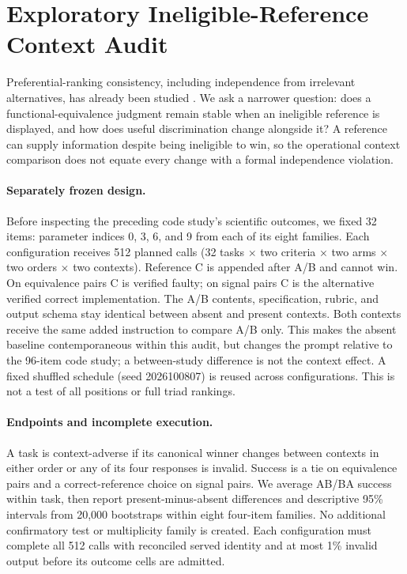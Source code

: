 \documentclass[10pt]{article}
\begin{document}
\section{Exploratory Ineligible-Reference Context Audit}
\label{sec:v7}

Preferential-ranking consistency, including independence from irrelevant alternatives, has already been studied \citep{zhao2024inconsistency}. We ask a narrower question: does a functional-equivalence judgment remain stable when an ineligible reference is displayed, and how does useful discrimination change alongside it? A reference can supply information despite being ineligible to win, so the operational context comparison does not equate every change with a formal independence violation.

\paragraph{Separately frozen design.}
Before inspecting the preceding code study's scientific outcomes, we fixed 32 items: parameter indices 0, 3, 6, and 9 from each of its eight families. Each configuration receives 512 planned calls (32 tasks $\times$ two criteria $\times$ two arms $\times$ two orders $\times$ two contexts). Reference C is appended after A/B and cannot win. On equivalence pairs C is verified faulty; on signal pairs C is the alternative verified correct implementation. The A/B contents, specification, rubric, and output schema stay identical between absent and present contexts. Both contexts receive the same added instruction to compare A/B only. This makes the absent baseline contemporaneous within this audit, but changes the prompt relative to the 96-item code study; a between-study difference is not the context effect. A fixed shuffled schedule (seed 2026100807) is reused across configurations. This is not a test of all positions or full triad rankings.

\paragraph{Endpoints and incomplete execution.}
A task is context-adverse if its canonical winner changes between contexts in either order or any of its four responses is invalid. Success is a tie on equivalence pairs and a correct-reference choice on signal pairs. We average AB/BA success within task, then report present-minus-absent differences and descriptive 95\% intervals from 20,000 bootstraps within eight four-item families. No additional confirmatory test or multiplicity family is created. Each configuration must complete all 512 calls with reconciled served identity and at most 1\% invalid output before its outcome cells are admitted.
\end{document}
